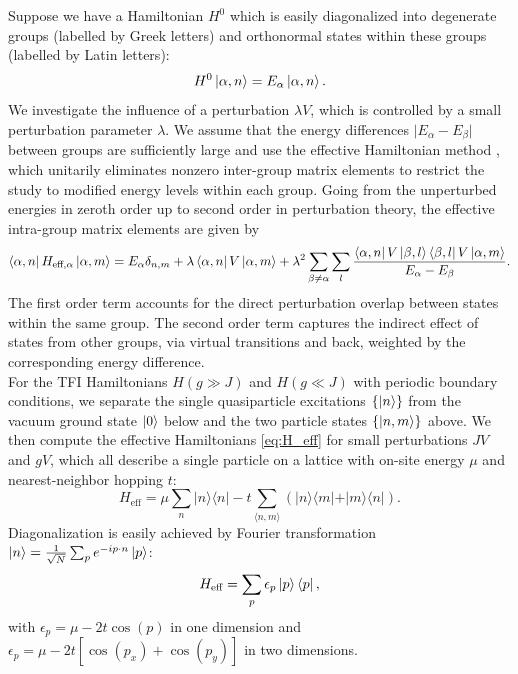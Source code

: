 \noindent Suppose we have a Hamiltonian $H^0$ which is easily diagonalized into degenerate groups (labelled by Greek letters) and orthonormal states within these groups (labelled by Latin letters): 
\begin{equation}
	H^0 \ket{\alpha, n} = E_{\alpha} \ket{\alpha, n}.
\end{equation}
We investigate the influence of a perturbation $\lambda V$, which is controlled by a small perturbation parameter $\lambda$. We assume that the energy differences $\vert E_{\alpha} - E_{\beta} \vert$ between groups are sufficiently large and use the effective Hamiltonian method \cite{sachdev2011quantum}, which unitarily eliminates nonzero inter-group matrix elements to restrict the study to modified energy levels within each group. Going from the unperturbed energies in zeroth order up to second order in perturbation theory, the effective intra-group matrix elements are given by
\begin{equation} \label{eq:H_eff}
	\bra{\alpha, n} H_{\text{eff}, \alpha} \ket{\alpha, m} = E_{\alpha} \delta_{n, m} + \lambda \bra{\alpha, n} V \ket{\alpha, m} + \lambda^2 \sum_{\beta \neq \alpha} \sum_{l} \frac{\bra{\alpha, n} V \ket{\beta, l} \bra{\beta, l} V \ket{\alpha, m}}{E_{\alpha} - E_{\beta}}.
\end{equation}
 The first order term accounts for the direct perturbation overlap between states within the same group. The second order term captures the indirect effect of states from other groups, via virtual transitions and back, weighted by the corresponding energy difference. \\
 
 \noindent For the TFI Hamiltonians $H(g \gg J)$ and $H(g \ll J)$ with periodic boundary conditions, we separate the single quasiparticle excitations $\{ \ket{n} \}$ from the vacuum ground state $\ket{0}$ below and the two particle states $\{ \ket{n, m} \}$ above. We then compute the effective Hamiltonians \eqref{eq:H_eff} for small perturbations $J V$ and $g V$, which all describe a single particle on a lattice with on-site energy $\mu$ and nearest-neighbor hopping $t$:
 \begin{equation}
 	H_{\text{eff}} =  
	 \mu \sum_n \vert n \rangle \langle n \vert 
	- t \sum_{\langle n, m \rangle} \left( \vert n \rangle \langle m \vert + \vert m \rangle \langle n \vert \right).
 \end{equation}
Diagonalization is easily achieved by Fourier transformation $\ket{n} = \frac{1}{\sqrt{N}} \sum_p e^{-ip \cdot n} \ket{p}$:
\begin{equation}
	H_{\text{eff}} = \sum_p \epsilon_p \ket{p}\bra{p},
\end{equation}
with $\epsilon_p =  \mu - 2t \cos(p)$ in one dimension and $\epsilon_p =  \mu - 2t \left[ \cos(p_x) + \cos(p_y) \right]$ in two dimensions. \\

